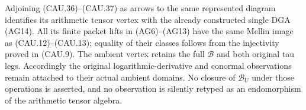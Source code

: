 Adjoining (CAU.36)--(CAU.37) as arrows to the same represented diagram
identifies its arithmetic tensor vertex with the already constructed
single DGA (AG14).  All its finite packet lifts in (AG6)--(AG13)
have the same Mellin image as (CAU.12)--(CAU.13); equality of their
classes follows from the injectivity proved in (CAU.9).
The ambient vertex retains the full $\mathscr B$ and both original
tau legs.  Accordingly the original logarithmic-derivative and
conormal observations remain attached to their actual ambient
domains.  No closure of $\mathscr B_U$ under those operations is
asserted, and no observation is silently retyped as an endomorphism
of the arithmetic tensor algebra.
